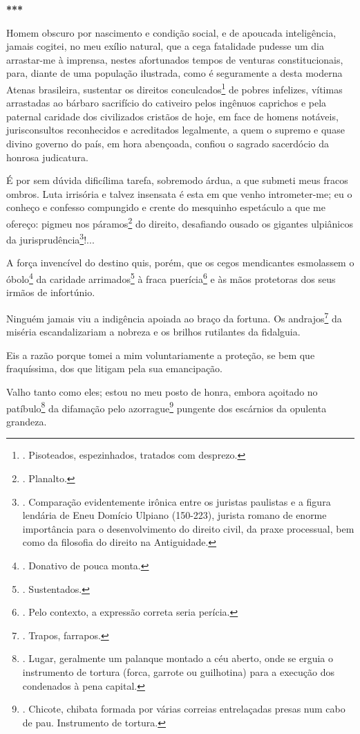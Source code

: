 \textbf{***}

Homem obscuro por nascimento e condição social, e de apoucada
inteligência, jamais cogitei, no meu exílio natural, que a cega
fatalidade pudesse um dia arrastar-me à imprensa, nestes afortunados
tempos de venturas constitucionais, para, diante de uma população
ilustrada, como é seguramente a desta moderna Atenas brasileira,
sustentar os direitos conculcados\footnote{. Pisoteados, espezinhados,
  tratados com desprezo.} de pobres infelizes, vítimas arrastadas ao
bárbaro sacrifício do cativeiro pelos ingênuos caprichos e pela paternal
caridade dos civilizados cristãos de hoje, em face de homens notáveis,
jurisconsultos reconhecidos e acreditados legalmente, a quem o supremo e
quase divino governo do país, em hora abençoada, confiou o sagrado
sacerdócio da honrosa judicatura.

É por sem dúvida dificílima tarefa, sobremodo árdua, a que submeti meus
fracos ombros. Luta irrisória e talvez insensata é esta em que venho
intrometer-me; eu o conheço e confesso compungido e crente do mesquinho
espetáculo a que me ofereço: pigmeu nos páramos\footnote{. Planalto.} do
direito, desafiando ousado os gigantes ulpiânicos da
jurisprudência\footnote{. Comparação evidentemente irônica entre os
  juristas paulistas e a figura lendária de Eneu Domício Ulpiano
  (150-223), jurista romano de enorme importância para o desenvolvimento
  do direito civil, da praxe processual, bem como da filosofia do
  direito na Antiguidade.}!...

A força invencível do destino quis, porém, que os cegos mendicantes
esmolassem o óbolo\footnote{. Donativo de pouca monta.} da caridade
arrimados\footnote{. Sustentados.} à fraca puerícia\footnote{. Pelo
  contexto, a expressão correta seria perícia.} e às mãos protetoras dos
seus irmãos de infortúnio.

Ninguém jamais viu a indigência apoiada ao braço da fortuna. Os
andrajos\footnote{. Trapos, farrapos.} da miséria escandalizariam a
nobreza e os brilhos rutilantes da fidalguia.

Eis a razão porque tomei a mim voluntariamente a proteção, se bem que
fraquíssima, dos que litigam pela sua emancipação.

Valho tanto como eles; estou no meu posto de honra, embora açoitado no
patíbulo\footnote{. Lugar, geralmente um palanque montado a céu aberto,
  onde se erguia o instrumento de tortura (forca, garrote ou guilhotina)
  para a execução dos condenados à pena capital.} da difamação pelo
azorrague\footnote{. Chicote, chibata formada por várias correias
  entrelaçadas presas num cabo de pau. Instrumento de tortura.} pungente
dos escárnios da opulenta grandeza.

